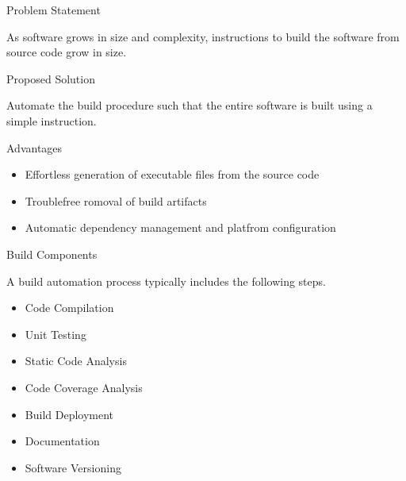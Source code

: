 \documentclass[compress]{beamer}
\begin{document}
\begin{slide}
	\begin{block}{Problem Statement}

	As software grows in size and complexity, instructions to build the software from source code grow in size.

	\end{block}
\end{slide}

\begin{slide}
	\begin{block}{Proposed Solution}

	Automate the build procedure such that the entire software is built using a simple instruction.

	\end{block}
\end{slide}

\begin{slide}
	\begin{block}{Advantages}

	\begin{itemize}
	\item[] Effortless generation of executable files from the source code
	\item[] Troublefree romoval of build artifacts
	\item[] Automatic dependency management and platfrom configuration
	\end{itemize}

	\end{block}
\end{slide}

\begin{slide}
	\begin{block}{Build Components}

	A build automation process typically includes the following steps.

	\begin{itemize}
	\item[] Code Compilation
	\item[] Unit Testing
	\item[] Static Code Analysis
	\item[] Code Coverage Analysis
	\item[] Build Deployment
	\item[] Documentation
	\item[] Software Versioning
	\end{itemize}

	\end{block}
\end{slide}
\end{document}

